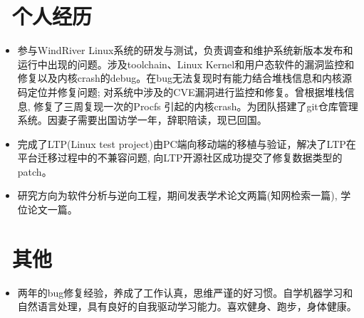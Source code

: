 \documentclass[10pt]{resume}
\begin{document}
\section{\faUsers\ 个人经历}\normalsize
{}
\begin{itemize}
\item {参与WindRiver Linux系统的研发与测试，负责调查和维护系统新版本发布和运行中出现的问题。涉及toolchain、Linux Kernel和用户态软件的漏洞监控和修复以及内核crash的debug。在bug无法复现时有能力结合堆栈信息和内核源码定位并修复问题; 对系统中涉及的CVE漏洞进行监控和修复。曾根据堆栈信息, 修复了三周复现一次的Procfs 引起的内核crash。为团队搭建了git仓库管理系统。因妻子需要出国访学一年，辞职陪读，现已回国。}
\end{itemize}
\begin{itemize}
\item {完成了LTP(Linux test project)由PC端向移动端的移植与验证，解决了LTP在平台迁移过程中的不兼容问题, 向LTP开源社区成功提交了修复数据类型的patch。}
\end{itemize}
\begin{itemize}
\item {研究方向为软件分析与逆向工程，期间发表学术论文两篇(知网检索一篇), 学位论文一篇。}
\end{itemize}
\section{\faInfo\ 其他}
\begin{itemize}\normalsize
\item {两年的bug修复经验，养成了工作认真，思维严谨的好习惯。自学机器学习和自然语言处理，具有良好的自我驱动学习能力。喜欢健身、跑步，身体健康。}
  \end{itemize}
\end{document}
